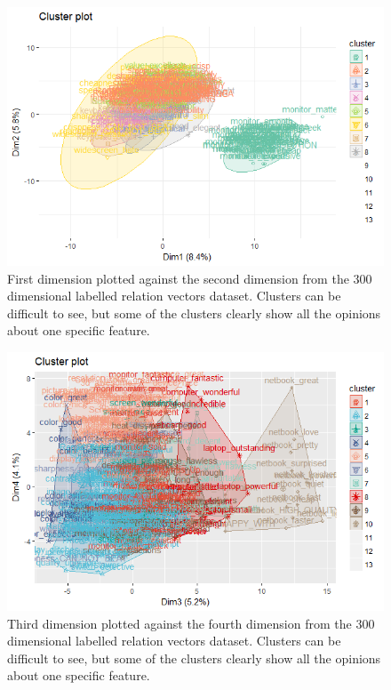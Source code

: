 \documentclass{sig-alternate}
\begin{document}
\begin{figure}
\centering
\includegraphics[scale=0.5]{images/Rplot01.png}
\caption{First dimension plotted against the second dimension from the 300 dimensional labelled relation vectors dataset. Clusters can be difficult to see, but some of the clusters clearly show all the opinions about one specific feature.}
\end{figure}

\begin{figure}
\centering
\includegraphics[scale=0.5]{images/Rplot.png}
\caption{Third dimension plotted against the fourth dimension from the 300 dimensional labelled relation vectors dataset. Clusters can be difficult to see, but some of the clusters clearly show all the opinions about one specific feature.}
\end{figure}
\end{document}
